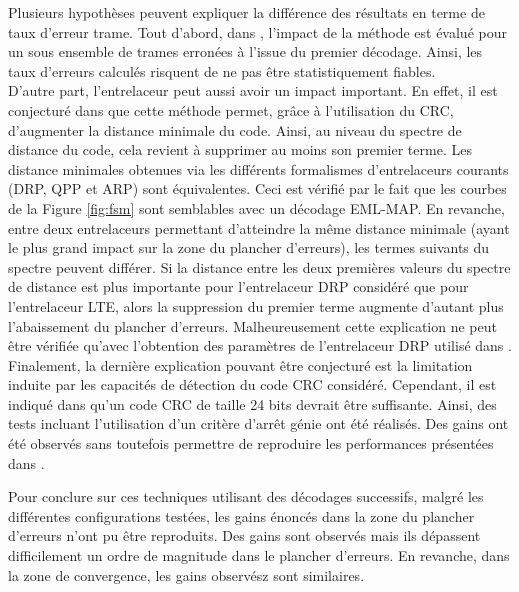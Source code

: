 Plusieurs hypothèses peuvent expliquer la différence des résultats en terme de taux d'erreur trame. Tout 
d'abord,  dans \cite{cim}, l'impact de la méthode est évalué pour un sous ensemble de trames erronées à l'issue du premier 
décodage. Ainsi, les taux d'erreurs calculés risquent de ne pas être statistiquement fiables. \\
D'autre part, l'entrelaceur peut aussi avoir un impact important.
En effet, il est conjecturé dans \cite{fsm} que cette méthode permet, grâce à l'utilisation du CRC, d'augmenter la distance
minimale du code. Ainsi, au niveau du spectre de distance du code, cela revient à supprimer au moins son premier terme.
Les distance minimales obtenues via les différents formalismes d'entrelaceurs courants (DRP, QPP et ARP) sont équivalentes. 
Ceci est vérifié par le fait que les courbes de la Figure \ref{fig:fsm} sont semblables avec un décodage 
EML-MAP. En revanche, entre deux entrelaceurs permettant d'atteindre la même distance minimale (ayant le plus grand impact
sur la zone du plancher d'erreurs), les termes suivants du spectre peuvent différer. Si la distance entre les deux 
premières valeurs du spectre de distance est plus importante pour l'entrelaceur DRP considéré que pour l'entrelaceur LTE, alors la 
suppression du premier terme augmente d'autant plus l'abaissement du plancher d'erreurs. Malheureusement cette explication ne 
peut être vérifiée qu'avec l'obtention des paramètres de l'entrelaceur DRP utilisé dans \cite{cim}.\\
Finalement, la dernière explication pouvant être conjecturé est la limitation induite par les capacités de détection du
code CRC considéré. Cependant, il est indiqué dans \cite{fsm} qu'un code CRC de taille 24 bits devrait être suffisante. Ainsi, 
des tests incluant l'utilisation d'un critère d'arrêt génie ont été réalisés. Des gains ont été observés sans toutefois 
permettre de reproduire les performances présentées dans \cite{cim}.

Pour conclure sur ces techniques utilisant des décodages successifs, malgré les différentes configurations testées, les 
gains énoncés dans la zone du plancher d'erreurs n'ont pu être reproduits. Des gains sont observés mais ils 
dépassent difficilement un ordre de magnitude dans le plancher d'erreurs. En revanche, dans la zone de convergence, les gains 
observész sont similaires. 

